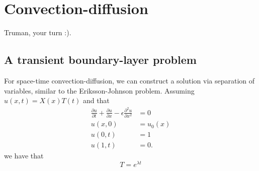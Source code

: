 \documentclass{article}
\newcommand{\pd}[2]{\frac{\partial#1}{\partial#2}}
\newcommand{\pdd}[2]{\frac{\partial^2#1}{\partial#2^2}}
\newcommand{\nor}[1]{\left\| #1 \right\|}
\newcommand{\LRp}[1]{\left( #1 \right)}
\newcommand{\LRs}[1]{\left[ #1 \right]}
\newcommand{\LRa}[1]{\left\langle #1 \right\rangle}
\newcommand{\jump}[1] {\ensuremath{\LRs{\![#1]\!}}}
\newcommand{\uh}{\widehat{u}}
\renewcommand{\L}{L^2\LRp{\Omega}}
\begin{document}
\section{Convection-diffusion}

Truman, your turn :).


\subsection{A transient boundary-layer problem}

For space-time convection-diffusion, we can construct a solution via separation of variables, similar to the Eriksson-Johnson problem.  Assuming $u(x,t) = X(x)T(t)$ and that 
\begin{align*}
\pd{u}{t} + \pd{u}{x} - \epsilon\pdd{u}{x} &= 0\\
u(x,0) &= u_0(x)\\
u(0,t) &= 1\\
u(1,t) &= 0.
\end{align*}
we have that 
\[
T = e^{\lambda t}
\]

%
\end{document}
